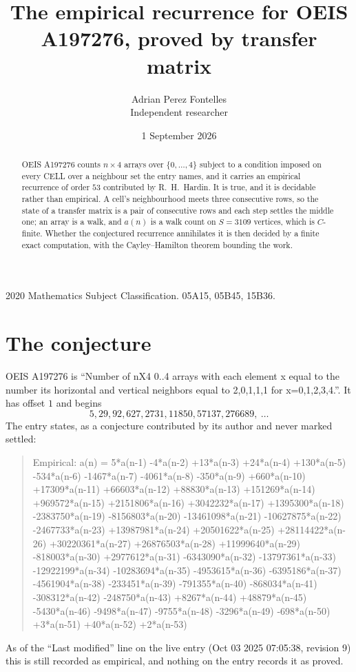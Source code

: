 \documentclass[11pt,a4paper]{article}
\title{The empirical recurrence for OEIS A197276, proved by transfer matrix}
\author{Adrian Perez Fontelles\\ \small Independent researcher}
\date{1 September 2026}
\theoremstyle{plain}
\theoremstyle{definition}
\begin{document}
\maketitle

\begin{abstract}
OEIS A197276 counts $n\times4$ arrays over $\{0,\dots,4\}$ subject to a condition imposed on
every CELL over a neighbour set the entry names, and it carries an empirical recurrence of
order $53$ contributed by R.~H.~Hardin. It is true, and it is decidable rather than
empirical. A cell's neighbourhood meets three consecutive rows, so the state of a transfer
matrix is a pair of consecutive rows and each step settles the middle one; an array is a
walk, and $a(n)$ is a walk count on $S=3109$ vertices, which is $C$-finite. Whether the
conjectured recurrence annihilates it is then decided by a finite exact computation, with the
Cayley--Hamilton theorem bounding the work.
\end{abstract}

\noindent\small 2020 Mathematics Subject Classification. 05A15, 05B45, 15B36.\normalsize

\section{The conjecture}

OEIS A197276 is ``Number of nX4 0..4 arrays with each element x equal to the number its horizontal and vertical neighbors equal to 2,0,1,1,1 for x=0,1,2,3,4.''. It has offset $1$ and begins
\[
5, 29, 92, 627, 2731, 11850, 57137, 276689,\ \dots
\]
The entry states, as a conjecture contributed by its author and never marked settled:
\begin{quote}
Empirical: a(n) = 5*a(n-1) -4*a(n-2) +13*a(n-3) +24*a(n-4) +130*a(n-5) -534*a(n-6) -1467*a(n-7) -4061*a(n-8) -350*a(n-9) +660*a(n-10) +17309*a(n-11) +66603*a(n-12) +88830*a(n-13) +151269*a(n-14) +969572*a(n-15) +2151806*a(n-16) +3042232*a(n-17) +1395300*a(n-18) -2383750*a(n-19) -8156803*a(n-20) -13461098*a(n-21) -10627875*a(n-22) -2467733*a(n-23) +13987981*a(n-24) +20501622*a(n-25) +28114422*a(n-26) +30220361*a(n-27) +26876503*a(n-28) +11999640*a(n-29) -818003*a(n-30) +2977612*a(n-31) -6343090*a(n-32) -13797361*a(n-33) -12922199*a(n-34) -10283694*a(n-35) -4953615*a(n-36) -6395186*a(n-37) -4561904*a(n-38) -233451*a(n-39) -791355*a(n-40) -868034*a(n-41) -308312*a(n-42) -248750*a(n-43) +8267*a(n-44) +48879*a(n-45) -5430*a(n-46) -9498*a(n-47) -9755*a(n-48) -3296*a(n-49) -698*a(n-50) +3*a(n-51) +40*a(n-52) +2*a(n-53)
\end{quote}
As of the ``Last modified'' line on the live entry (Oct 03 2025 07:05:38, revision 9) this is still
recorded as empirical, and nothing on the entry records it as proved.
\end{document}
